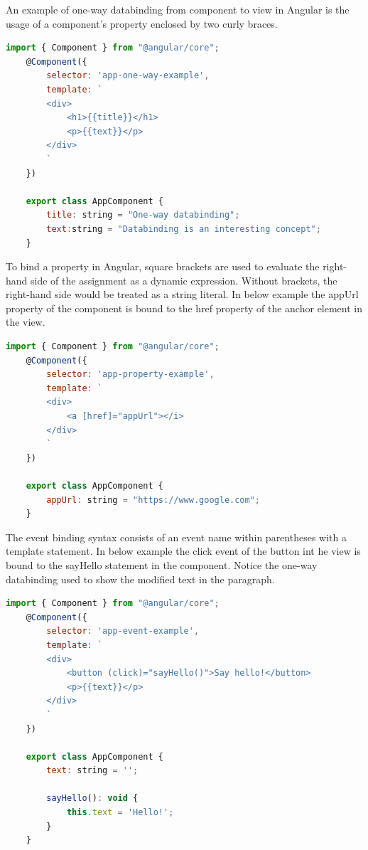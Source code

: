 An example of one-way databinding from component to view in Angular is the usage of a component's property enclosed by two curly braces.
\autocite{Goudar2019}
\begin{lstlisting}[language=Javascript]
	import { Component } from "@angular/core";
	@Component({
		selector: 'app-one-way-example',
		template: `
		<div>
			<h1>{{title}}</h1>
			<p>{{text}}</p>
		</div>
		`
	})
	
	export class AppComponent {
		title: string = "One-way databinding";
		text:string = "Databinding is an interesting concept";
	}
\end{lstlisting}

To bind a property in Angular, square brackets are used to evaluate the right-hand side of the assignment as a dynamic expression. Without brackets, the right-hand side would be treated as a string literal. In below example the appUrl property of the component is bound to the href property of the anchor element in the view.
\autocite{AngularProperty}
\begin{lstlisting}[language=Javascript]
	import { Component } from "@angular/core";
	@Component({
		selector: 'app-property-example',
		template: `
		<div>
			<a [href]="appUrl"></i>
		</div>
		`
	})
	
	export class AppComponent {
		appUrl: string = "https://www.google.com";
	}
\end{lstlisting}

The event binding syntax consists of an event name within parentheses with a template statement. In below example the click event of the button int he view is bound to the sayHello statement in the component. Notice the one-way databinding used to show the modified text in the paragraph.
\autocite{AngularEvent}
\begin{lstlisting}[language=Javascript]
	import { Component } from "@angular/core";
	@Component({
		selector: 'app-event-example',
		template: `
		<div>
			<button (click)="sayHello()">Say hello!</button>
			<p>{{text}}</p>
		</div>
		`
	})
	
	export class AppComponent {
		text: string = '';
		
		sayHello(): void {
			this.text = 'Hello!';
		}
	}
\end{lstlisting}


